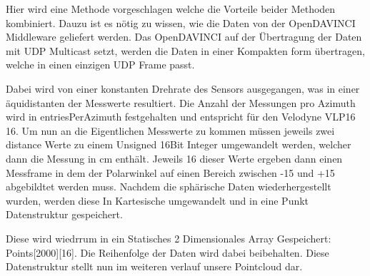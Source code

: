 \documentclass[11pt,oneside,openright]{mpreport}
\begin{document}
Hier wird eine Methode vorgeschlagen welche die Vorteile beider Methoden kombiniert. Dauzu ist es nötig zu wissen, wie die Daten von der OpenDAVINCI 
Middleware geliefert werden. Das OpenDAVINCI auf der Übertragung der Daten mit UDP Multicast setzt, werden die Daten in einer Kompakten form übertragen, welche in einen einzigen
UDP Frame passt.\\
\begin{center}
\end{center}
Dabei wird von einer konstanten Drehrate des Sensors ausgegangen, was in einer äquidistanten der Messwerte resultiert. Die Anzahl der Messungen pro Azimuth
wird in entriesPerAzimuth festgehalten und entspricht für den Velodyne VLP16 16. Um nun an die Eigentlichen Messwerte zu kommen müssen jeweils zwei distance Werte zu
einem Unsigned 16Bit Integer umgewandelt werden, welcher dann die Messung in cm enthält. Jeweils 16 dieser Werte ergeben dann einen Messframe in dem der Polarwinkel
auf einen Bereich zwischen -15 und +15 abgebildtet werden muss. Nachdem die sphärische Daten wiederhergestellt wurden, werden diese In Kartesische umgewandelt und
in eine Punkt Datenstruktur gespeichert. 

\begin{center}
\end{center}

Diese wird wiedrrum in ein Statisches 2 Dimensionales Array Gespeichert: Points[2000][16]. Die Reihenfolge der Daten wird dabei beibehalten.
Diese Datenstruktur stellt nun im weiteren verlauf unsere Pointcloud dar.
\end{document}
